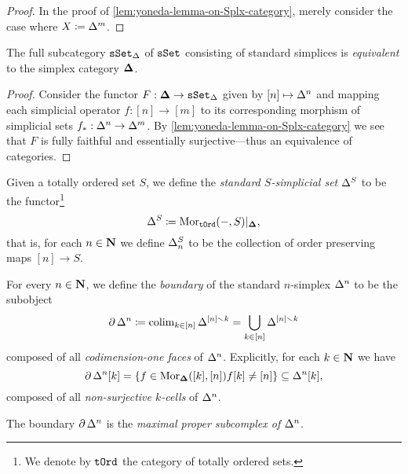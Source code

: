 \begin{proof}
In the proof of \cref{lem:yoneda-lemma-on-Splx-category}, merely consider the
case where \(X \coloneq \Delta^m\).
\end{proof}

\begin{corollary}
\label{cor:standard-simplices-equivalent-Splx}
The full subcategory \({\texttt{sSet}}_{\Delta}\) of \({\texttt{sSet}}\) consisting of standard
simplices is \emph{equivalent} to the simplex category \({\mathbf{\Delta}}\).
\end{corollary}

\begin{proof}
Consider the functor \(F: {\mathbf{\Delta}} \to {\texttt{sSet}}_{\Delta}\) given by
\([n] \mapsto \Delta^n\) and mapping each simplicial operator \(f: [n] \to [m]\)
to its corresponding morphism of simplicial sets \(f_{*}: \Delta^n \to
\Delta^m\). By \cref{lem:yoneda-lemma-on-Splx-category} we see that \(F\) is
fully faithful and essentially surjective---thus an equivalence of categories.
\end{proof}

\begin{definition}
\label{def:standard-simplex-on-totally-ordered-set}
Given a totally ordered set \(S\), we define the \emph{standard \(S\)-simplicial
set} \(\Delta^S\) to be the functor\footnote{We denote by \({\texttt{tOrd}}\) the category
of totally ordered sets.}
\[
\Delta^{S} \coloneq \operatorname{Mor}_{{\texttt{tOrd}}}(-, S)|_{{\mathbf{\Delta}}},
\]
that is, for each \(n \in \mathbf{N}\) we define \(\Delta^S_n\) to be the collection of
order preserving maps \([n] \to S\).
\end{definition}

\begin{definition}
\label{def:boundary-of-standard-simplex}
For every \(n \in \mathbf{N}\), we define the \emph{boundary} of the standard
\(n\)-simplex \(\Delta^n\) to be the subobject
\[
\operatorname{\partial} \Delta^n \coloneq \operatorname{colim}_{k \in [n]} \Delta^{[n] \smallsetminus k}
= \bigcup_{k \in [n]} \Delta^{[n] \smallsetminus k}
\]
composed of all \emph{codimension-one faces} of \(\Delta^n\). Explicitly, for
each \(k \in \mathbf{N}\) we have
\[
\operatorname{\partial} \Delta^n [k] = \{ f \in \operatorname{Mor}_{{\mathbf{\Delta}}}([k], [n]) \relax f[k] \neq [n] \}
\subseteq \Delta^n[k],
\]
composed of all \emph{non-surjective \(k\)-cells} of \(\Delta^n\).
\end{definition}

\begin{proposition}
\label{prop:boundary-maximal-proper-subcomplex}
The boundary \(\operatorname{\partial} \Delta^n\) is the \emph{maximal proper subcomplex of
  \(\Delta^n\)}.
\end{proposition}

